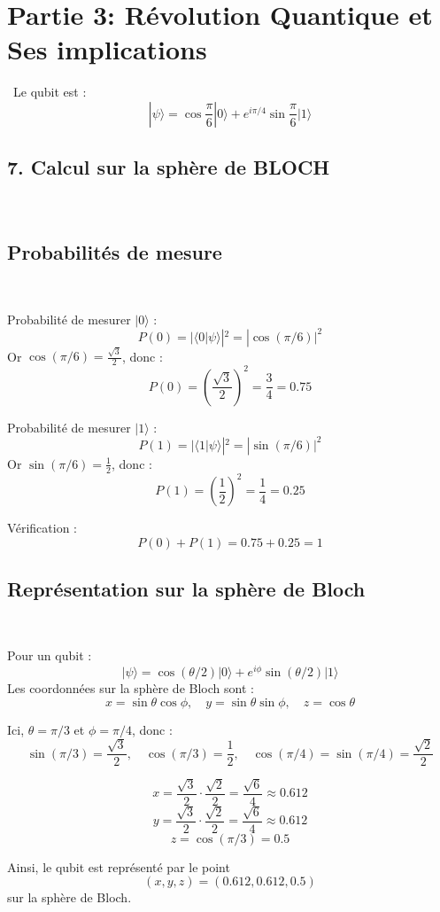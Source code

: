 \documentclass[12pt,a4paper]{report}
\begin{document}
	{\Large
		\section*{Partie 3: Révolution Quantique et Ses implications}\
		Le qubit est :
		\[
		|\psi\rangle = \cos\frac{\pi}{6}|0\rangle + e^{i\pi/4}\sin\frac{\pi}{6}|1\rangle
		\]
		\subsection*{7. Calcul sur la sphère de BLOCH}\
		\subsection*{Probabilités de mesure}\
		
		{Probabilité de mesurer } $|0\rangle$ :
		\[
		P(0) = |\langle 0|\psi\rangle|^2 = |\cos(\pi/6)|^2
		\]
		Or $\cos(\pi/6) = \frac{\sqrt{3}}{2}$, donc :
		\[
		P(0) = \left(\frac{\sqrt{3}}{2}\right)^2 = \frac{3}{4} = 0.75
		\]
		
		{Probabilité de mesurer } $|1\rangle$ :
		\[
		P(1) = |\langle 1|\psi\rangle|^2 = |\sin(\pi/6)|^2
		\]
		Or $\sin(\pi/6) = \frac{1}{2}$, donc :
		\[
		P(1) = \left(\frac{1}{2}\right)^2 = \frac{1}{4} = 0.25
		\]
		
		Vérification : 
		\[
		P(0) + P(1) = 0.75 + 0.25 = 1
		\]
		
		\subsection*{Représentation sur la sphère de Bloch}\
		
		Pour un qubit :
		\[
		|\psi\rangle = \cos(\theta/2)|0\rangle + e^{i\phi}\sin(\theta/2)|1\rangle
		\]
		Les coordonnées sur la sphère de Bloch sont :
		\[
		x = \sin\theta \cos\phi, \quad y = \sin\theta \sin\phi, \quad z = \cos\theta
		\]
		
		Ici, $\theta = \pi/3$ et $\phi = \pi/4$, donc :
		\[
		\sin(\pi/3) = \frac{\sqrt{3}}{2}, \quad \cos(\pi/3) = \frac{1}{2}, \quad \cos(\pi/4) = \sin(\pi/4) = \frac{\sqrt{2}}{2}
		\]
		
		\[
		x = \frac{\sqrt{3}}{2} \cdot \frac{\sqrt{2}}{2} = \frac{\sqrt{6}}{4} \approx 0.612
		\]
		\[
		y = \frac{\sqrt{3}}{2} \cdot \frac{\sqrt{2}}{2} = \frac{\sqrt{6}}{4} \approx 0.612
		\]
		\[
		z = \cos(\pi/3) = 0.5
		\]
		
		Ainsi, le qubit est représenté par le point 
		\[
		(x, y, z) = (0.612, 0.612, 0.5)
		\]
		sur la sphère de Bloch.
		
}
\end{document}

